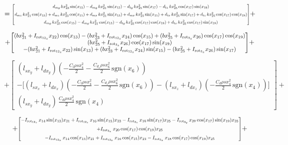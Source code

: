 \begin{equation*}
= \resizebox{0.99\textwidth}{!}{$
	\begin{bmatrix}
		d_{my}\,kx_{23}^2 \sin(x_{15})
		- d_{my}\,kx_{21}^2 \sin(x_{13})
		- d_{ty}\,kx_{25}^2 \sin(x_{17})
		- d_{tz}\,kx_{25}^2 \cos(x_{17})\sin(x_{19}) \\[6pt]
		d_{mz}\,kx_{21}^2 \cos(x_{13})
		+ d_{mz}\,kx_{23}^2 \cos(x_{15})
		+ d_{mx}\,kx_{21}^2 \sin(x_{13})
		+ d_{mx}\,kx_{23}^2 \sin(x_{15})
		+ d_{tx}\,kx_{25}^2 \sin(x_{17})
		+ d_{tz}\,kx_{25}^2 \cos(x_{17})\cos(x_{19}) \\[6pt]
		d_{my}\,kx_{23}^2 \cos(x_{15})
		- d_{my}\,kx_{21}^2 \cos(x_{13})
		- d_{ty}\,kx_{25}^2 \cos(x_{17})\cos(x_{19})
		+ d_{tx}\,kx_{25}^2 \cos(x_{17})\sin(x_{19})
	\end{bmatrix}
	$} +
\end{equation*}

\begin{equation*}
+ \resizebox{0.99\textwidth}{!}{$
	\begin{bmatrix}
	(bx_{21}^2+I_{\text{rot}_{12_{z}}}x_{22}) \cos(x_{13}) -	(bx_{23}^2+I_{\text{rot}_{12_{z}}}x_{24}) \cos(x_{15}) + (bx_{25}^2+I_{\text{rot}_{3_{z}}}x_{26})\cos(x_{17})\cos(x_{19}) \\
	(bx_{25}^2+I_{\text{rot}_{3_{z}}}x_{26})\cos(x_{17})\sin(x_{19}) \\
	-	(bx_{21}^2+I_{\text{rot}_{12_{z}}}x_{22})\sin(x_{13})+ 	(bx_{23}^2+I_{\text{rot}_{12_{z}}}x_{24})  \sin(x_{15})	-	(bx_{25}^2+I_{\text{rot}_{3_{z}}}x_{26})\sin(x_{17})
\end{bmatrix}$} +
\end{equation*}

\begin{equation*}
+
\begin{bmatrix}
	(l_{sx_y}+l_{dx_y})\left(-\tfrac{C_l \rho s x_4^2}{2} - \tfrac{C_{d_z} \rho s x_6^2}{2}\,\text{sgn}(x_6)\right) \\[10pt]
	-\Big[(l_{sx_x}+l_{dx_x})\left(-\tfrac{C_l \rho s x_4^2}{2} - \tfrac{C_{d_z} \rho s x_6^2}{2}\,\text{sgn}(x_6)\right)
	- (l_{sx_z}+l_{dx_z})\left(-\tfrac{C_d \rho s x_4^2}{2}\,\text{sgn}(x_4)\right)\Big] \\[10pt]
	(l_{sx_y}+l_{dx_y})\,\tfrac{C_d \rho s x_4^2}{2}\,\text{sgn}(x_4)
\end{bmatrix}
+
\end{equation*}

\begin{equation*}
+
\resizebox{0.93\textwidth}{!}{$
	\begin{bmatrix}
		-I_{\text{rot}_{12_{z}}}\,x_{14} \sin(x_{13}) x_{21}
		+ I_{\text{rot}_{12_{z}}}\,x_{16} \sin(x_{15})x_{23}
		- I_{\text{rot}_{3_{z}}}\,x_{18} \sin(x_{17}) x_{25}
		- I_{\text{rot}_{3_{y}}}\,x_{20} \cos(x_{17}) \sin(x_{19}) x_{25} \\[6pt]
		+ I_{\text{rot}_{3_{x}}}\,x_{20}\cos(x_{17}) \cos(x_{19})x_{25} \\[6pt]
		-I_{\text{rot}_{12_{x}}}\,x_{14}\cos(x_{13}) x_{21}
		+ I_{\text{rot}_{12_{x}}}\,x_{16} \cos(x_{15}) x_{23}
		- I_{\text{rot}_{3_{x}}}\,x_{18} \cos(x_{17}) \cos(x_{19}) x_{25}
	\end{bmatrix}
	$}
+
\end{equation*}

